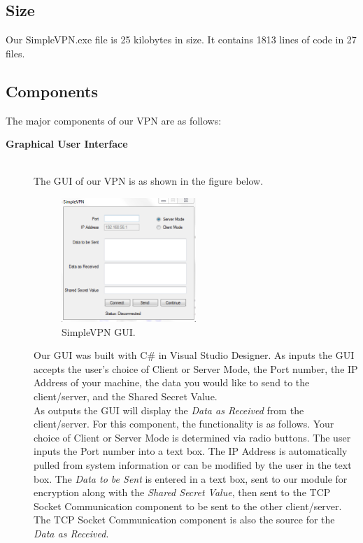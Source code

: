 \documentclass[journal]{IEEEtran}
\begin{document}
\subsection*{Size}
Our SimpleVPN.exe file is 25 kilobytes in size. It contains 1813 lines of code in 27 files.
\subsection*{Components}
The major components of our VPN are as follows:
\begin{description}
	\item[\bfseries Graphical User Interface] \hfill \\
	The GUI of our VPN is as shown in the figure below.
	\begin{figure}[H]
		\centering
		\caption{SimpleVPN GUI.}
		\includegraphics[width=0.5\textwidth]{GUI.png}
	\end{figure}
	Our GUI was built with C\# in Visual Studio Designer.
	As inputs the GUI accepts the user's choice of Client or Server Mode, the Port number, the IP Address of your machine, the data you would like to send to the client/server, and the Shared Secret Value.\\
	As outputs the GUI will display the \emph{Data as Received} from the client/server.%
	For this component, the functionality is as follows. Your choice of Client or Server Mode is determined via radio buttons. The user inputs the Port number into a text box. The IP Address is automatically pulled from system information or can be modified by the user in the text box. The \emph{Data to be Sent} is entered in a text box, sent to our module for encryption along with the \emph{Shared Secret Value}, then sent to the TCP Socket Communication component to be sent to the other client/server.  The TCP Socket Communication component is also the source for the \emph{Data as Received}. %
	

\end{description}
\end{document}
